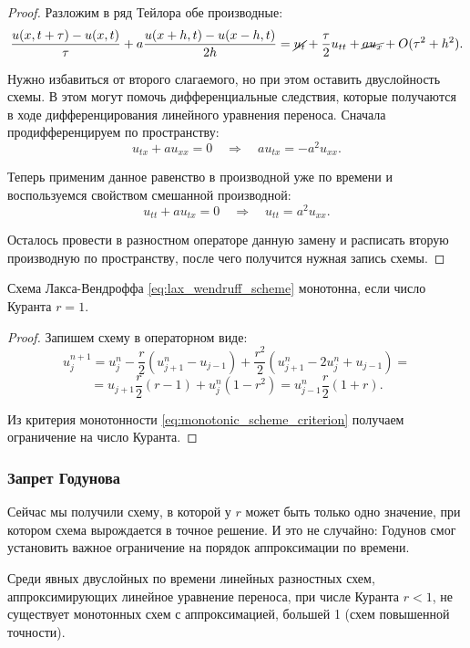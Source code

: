 \documentclass{article}
\begin{document}
\begin{proof}
	Разложим в ряд Тейлора обе производные:
	\[\frac{u(x,t+\tau)-u(x,t)}{\tau}+a\frac{u(x+h,t)-u(x-h,t)}{2h}=
	\cancel{u_t}+\frac{\tau}{2}u_{tt}+\cancel{au_x}+O(\tau^2+h^2).\]

	Нужно избавиться от второго слагаемого, но при этом оставить
	двуслойность схемы. В этом могут помочь дифференциальные следствия,
	которые получаются в ходе дифференцирования линейного уравнения
	переноса. Сначала продифференцируем по пространству:
	\[u_{tx}+au_{xx}=0\quad\Rightarrow\quad au_{tx}=-a^2u_{xx}.\]

	Теперь применим данное равенство в производной уже по времени и
	воспользуемся свойством смешанной производной:
	\[u_{tt}+au_{tx}=0\quad\Rightarrow\quad u_{tt}=a^2u_{xx}.\]

	Осталось провести в разностном операторе данную замену и расписать
	вторую производную по пространству, после чего получится нужная
	запись схемы.
\end{proof}

\begin{lemma}
	Схема Лакса-Вендроффа \eqref{eq:lax_wendruff_scheme} монотонна,
	если число Куранта $r=1$.
\end{lemma}

\begin{proof}
	Запишем схему в операторном виде:
	\[u_j^{n+1}=u_j^n-\frac{r}{2}(u_{j+1}^n-u_{j-1})+
	\frac{r^2}{2}(u_{j+1}^n-2u_j^n+u_{j-1})=\]
	\[=u_{j+1}\frac{r}{2}(r-1)+u_j^n(1-r^2)=u_{j-1}^n\frac{r}{2}(1+r).\]

	Из критерия монотонности \eqref{eq:monotonic_scheme_criterion} получаем
	ограничение на число Куранта.
\end{proof}

\subsubsection{Запрет Годунова}
Сейчас мы получили схему, в которой у $r$ может быть только одно значение, при
котором схема вырождается в точное решение. И это не случайно: Годунов смог
установить важное ограничение на порядок аппроксимации по времени.

\begin{theorem}
	Среди явных двуслойных по времени линейных разностных схем,
	аппроксимирующих линейное уравнение переноса, при числе Куранта
	$r<1$, не существует монотонных схем с аппроксимацией, большей 1
	(схем повышенной точности).
\end{theorem}
\end{document}
